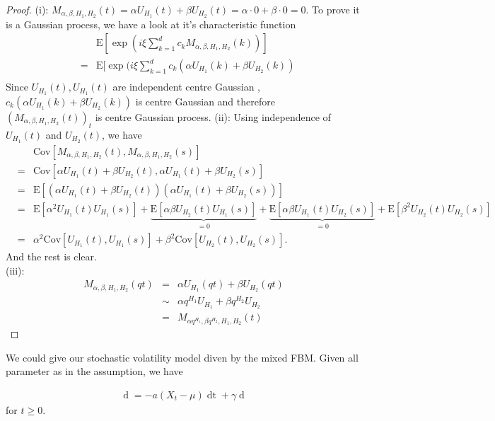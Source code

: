 \documentclass[a4paper, twoside, 11pt]{article}
\theoremstyle{definition}
\begin{document}
\begin{proof}
  (i): $M_{\alpha,\beta,H_1,H_2}(t) = \alpha U_{H_1}(t) + \beta U_{H_2}(t) = \alpha \cdot 0 + \beta \cdot 0 = 0$.
  To prove it is a Gaussian process, we have a look at it's characteristic function
  \begin{eqnarray*}
	&&\mathrm{E}[\exp(i\xi\sum\limits_{k=1}^{d} c_k M_{\alpha,\beta,H_1,H_2}(k))]\\
	&=& \mathrm{E}[\exp(i\xi\sum\limits_{k=1}^{d} c_k (\alpha U_{H_1}(k) + \beta U_{H_2}(k))\\
  \end{eqnarray*}
  Since $U_{H_1}(t), U_{H_1}(t)$ are independent centre Gaussian , $c_k (\alpha U_{H_1}(k) + \beta U_{H_2}(k))$ is centre Gaussian and therefore $(M_{\alpha,\beta,H_1,H_2}(t))_t$ is centre Gaussian process. 
  (ii): Using independence of $U_{H_1}(t)$ and $U_{H_2}(t)$, we have
  \begin{eqnarray*}
	&&\mathrm{Cov}[M_{\alpha,\beta,H_1,H_2}(t), M_{\alpha,\beta,H_1,H_2}(s)]\\
	&=& \mathrm{Cov}[\alpha U_{H_1}(t)+\beta U_{H_2}(t), \alpha U_{H_1}(t)+\beta U_{H_2}(s)]\\
	&=& \mathrm{E}[(\alpha U_{H_1}(t)+\beta U_{H_2}(t)) (\alpha U_{H_1}(t)+\beta U_{H_2}(s))]\\
	&=& \mathrm{E}[\alpha^2U_{H_1}(t)U_{H_1}(s)] + \underbrace{\mathrm{E}[\alpha \beta U_{H_2}(t)U_{H_1}(s)]}_{=0} + \underbrace{\mathrm{E}[\alpha\beta U_{H_1}(t)U_{H_2}(s)]}_{=0} +\mathrm{E}[\beta^2 U_{H_2}(t)U_{H_2}(s)] \\
	&=& \alpha^2 \mathrm{Cov}[U_{H_1}(t), U_{H_1}(s)] + \beta^2\mathrm{Cov}[U_{H_2}(t), U_{H_2}(s)].
  \end{eqnarray*}
And the rest is clear.\\
(iii): 
\begin{eqnarray*}
  M_{\alpha,\beta,H_1,H_2}(qt) &=&  \alpha U_{H_1}(qt)+\beta U_{H_2}(qt)\\
  &\sim& \alpha q^{H_1} U_{H_1} + \beta q^{H_2} U_{H_2}\\
  &=& M_{\alpha q^{H_1}, \beta q^{H_2}, H_1, H_2}(t)
\end{eqnarray*}
\end{proof}
We could give our stochastic volatility model diven by the mixed FBM. Given all parameter as in the assumption, we have 

\begin{eqnarray}
  \mathop{dX_t} = -a(X_t - \mu)\mathop{dt} + \gamma \mathop{dM_{\alpha,\beta,H_1,H_2}(t)}
  \label{sec:wfsv}
\end{eqnarray}
for $t\ge 0$.
\end{document}
